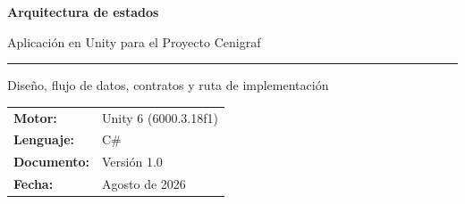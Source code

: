 \documentclass[11pt,letterpaper,oneside]{article}
\begin{document}
\hypersetup{pageanchor=false}
\begin{titlepage}
  \pagecolor{CenigrafNavy}
  \color{white}
  \vspace*{2.1cm}
  {\Huge\bfseries Arquitectura de estados\par}
  \vspace{0.35cm}
  {\LARGE Aplicación en Unity para el Proyecto Cenigraf\par}
  \vspace{1cm}
  {\color{CenigrafGold}\rule{\textwidth}{2pt}}
  \vspace{1cm}
  {\large Diseño, flujo de datos, contratos y ruta de implementación\par}
  \vfill
  \begin{tabular}{@{}ll@{}}
    \textbf{Motor:} & Unity 6 (6000.3.18f1) \\
    \textbf{Lenguaje:} & C\# \\
    \textbf{Documento:} & Versión 1.0 \\
    \textbf{Fecha:} & Agosto de 2026
  \end{tabular}
  \vspace{1.4cm}
\end{titlepage}
\hypersetup{pageanchor=true}
\nopagecolor
\color{black}

\tableofcontents
\clearpage
\listoffigures
\clearpage
{}








\end{document}
